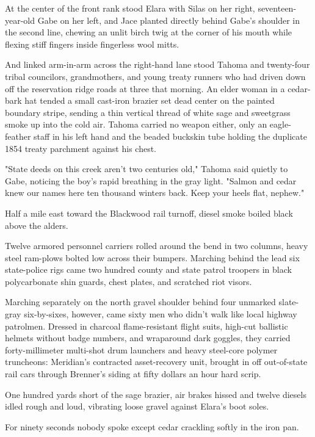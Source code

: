 At the center of the front rank stood Elara with Silas on her right, seventeen-year-old Gabe on her left, and Jace planted directly behind Gabe's shoulder in the second line, chewing an unlit birch twig at the corner of his mouth while flexing stiff fingers inside fingerless wool mitts.

And linked arm-in-arm across the right-hand lane stood Tahoma and twenty-four tribal councilors, grandmothers, and young treaty runners who had driven down off the reservation ridge roads at three that morning. An elder woman in a cedar-bark hat tended a small cast-iron brazier set dead center on the painted boundary stripe, sending a thin vertical thread of white sage and sweetgrass smoke up into the cold air. Tahoma carried no weapon either, only an eagle-feather staff in his left hand and the beaded buckskin tube holding the duplicate 1854 treaty parchment against his chest.

"State deeds on this creek aren't two centuries old," Tahoma said quietly to Gabe, noticing the boy's rapid breathing in the gray light. "Salmon and cedar knew our names here ten thousand winters back. Keep your heels flat, nephew."

Half a mile east toward the Blackwood rail turnoff, diesel smoke boiled black above the alders.

Twelve armored personnel carriers rolled around the bend in two columns, heavy steel ram-plows bolted low across their bumpers. Marching behind the lead six state-police rigs came two hundred county and state patrol troopers in black polycarbonate shin guards, chest plates, and scratched riot visors.

Marching separately on the north gravel shoulder behind four unmarked slate-gray six-by-sixes, however, came sixty men who didn't walk like local highway patrolmen. Dressed in charcoal flame-resistant flight suits, high-cut ballistic helmets without badge numbers, and wraparound dark goggles, they carried forty-millimeter multi-shot drum launchers and heavy steel-core polymer truncheons: Meridian's contracted asset-recovery unit, brought in off out-of-state rail cars through Brenner's siding at fifty dollars an hour hard scrip.

One hundred yards short of the sage brazier, air brakes hissed and twelve diesels idled rough and loud, vibrating loose gravel against Elara's boot soles.

For ninety seconds nobody spoke except cedar crackling softly in the iron pan.


